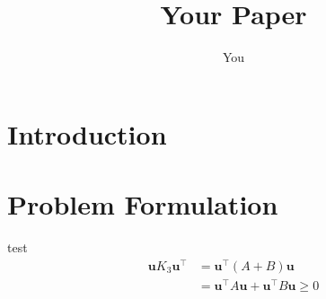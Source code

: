\documentclass{article}
\title{Your Paper}
\author{You}
\begin{document}
\maketitle

\newpage
\begin{abstract}

\end{abstract}

\section{Introduction}\cite{bishop}

\section{Problem Formulation}
    test\cite{bishop}
\begin{equation}
    \begin{aligned}
        \mathbf{u} K_3 \mathbf{u}^\intercal &=  \mathbf{u}^\intercal(A + B)\mathbf{u}\\
        &= \mathbf{u}^\intercal A\mathbf{u} + \mathbf{u}^\intercal B\mathbf{u} \ge 0
    \end{aligned}
\end{equation}
    






\end{document}
